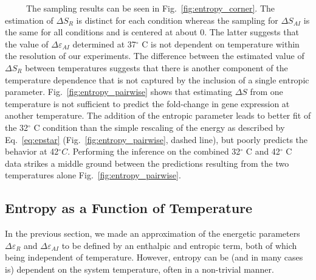 \documentclass[12pt]{caltech_thesis}
\begin{document}
~~~~~The sampling results can be seen in Fig.~\ref{fig:entropy_corner}.
The estimation of \(\Delta S_R\) is distinct for each condition whereas
the sampling for \(\Delta S_{AI}\) is the same for all conditions and is
centered at about 0. The latter suggests that the value of
\(\Delta\varepsilon_{AI}\) determined at 37\(^\circ\) C is not dependent
on temperature within the resolution of our experiments. The difference
between the estimated value of \(\Delta S_{R}\) between temperatures
suggests that there is another component of the temperature dependence
that is not captured by the inclusion of a single entropic parameter.
Fig.~\ref{fig:entropy_pairwise} shows that estimating \(\Delta S\) from
one temperature is not sufficient to predict the fold-change in gene
expression at another temperature. The addition of the entropic
parameter leads to better fit of the 32\(^\circ\) C condition than the
simple rescaling of the energy as described by Eq.~\ref{eq:epstar}
(Fig.~\ref{fig:entropy_pairwise}, dashed line), but poorly predicts the
behavior at 42\(^\circ C\). Performing the inference on the combined
32\(^\circ\) C and 42\(^\circ\) C data strikes a middle ground between
the predictions resulting from the two temperatures alone
Fig.~\ref{fig:entropy_pairwise}.

\hypertarget{entropy-as-a-function-of-temperature}{%
\subsection{Entropy as a Function of
Temperature}\label{entropy-as-a-function-of-temperature}}

In the previous section, we made an approximation of the energetic
parameters \(\Delta\varepsilon_{R}\) and \(\Delta\varepsilon_{AI}\) to
be defined by an enthalpic and entropic term, both of which being
independent of temperature. However, entropy can be (and in many cases
is) dependent on the system temperature, often in a non-trivial manner.
\end{document}
